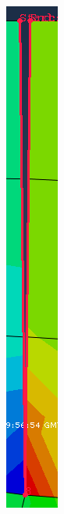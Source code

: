 \begin{itemize}
\begin{figure}[!h]
    \begin{subfigure}[!h]{0.07\textwidth}
      \includegraphics[width=\textwidth]{./body/images/post29}

\end{subfigure}
\end{figure}
\end{itemize}
